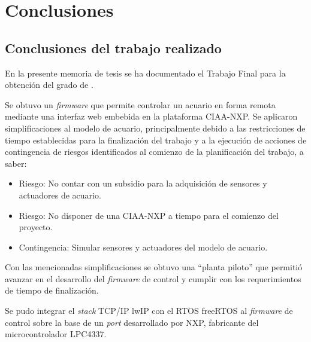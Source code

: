 
\chapter{Conclusiones} %

\label{Chapter5} %




\section{Conclusiones del trabajo realizado}

En la presente memoria de tesis se ha documentado el Trabajo Final para la obtención del grado de \degreename.  

Se obtuvo un \textit{firmware} que permite controlar un acuario en forma remota mediante una interfaz web embebida en la plataforma CIAA-NXP. Se aplicaron simplificaciones al modelo de acuario, principalmente debido a las restricciones de tiempo establecidas para la finalización del trabajo y a la ejecución de acciones de contingencia de riesgos identificados al comienzo de la planificación del trabajo, a saber:

\begin{itemize}
	\item Riesgo: No contar con un subsidio para la adquisición de sensores y actuadores de acuario.
	\item Riesgo: No disponer de una CIAA-NXP a tiempo para el comienzo del proyecto.
	\item Contingencia:  Simular sensores y actuadores del modelo de acuario.
\end{itemize}

Con las mencionadas simplificaciones se obtuvo una ``planta piloto'' que permitió avanzar en el desarrollo del \textit{firmware} de control y cumplir con los requerimientos de tiempo de finalización.

Se pudo integrar el \textit{stack} TCP/IP lwIP con el RTOS freeRTOS al \textit{firmware} de control sobre la base de un \textit{port} desarrollado por NXP, fabricante del microcontrolador LPC4337.

